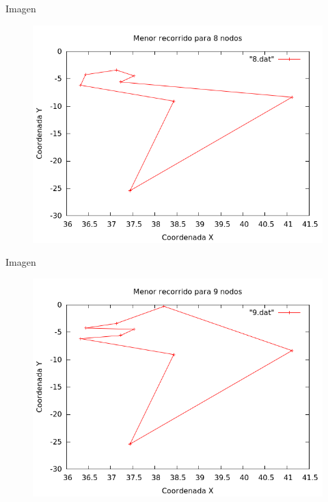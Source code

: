 \begin{frame}
	\begin{exampleblock}{Imagen}
	\begin{figure}[H]
    \centering
    \includegraphics[scale=0.35]{../TSP/Graficas/8.png}
	\end{figure}
	\end{exampleblock}
\end{frame}

\begin{frame}
	\begin{exampleblock}{Imagen}
	\begin{figure}[H]
    \centering
    \includegraphics[scale=0.35]{../TSP/Graficas/9.png}
	\end{figure}
	\end{exampleblock}
\end{frame}

